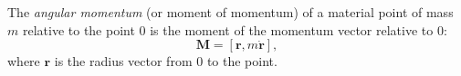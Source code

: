 The \textit{angular momentum} (or moment of momentum) of a material point of mass $m$ relative to the point $0$ is the moment of the momentum vector relative to $0$:
$$\mathbf{M} = [\mathbf{r}, m\dot{\mathbf{r}}],$$
where $\mathbf{r}$ is the radius vector from $0$ to the point.
